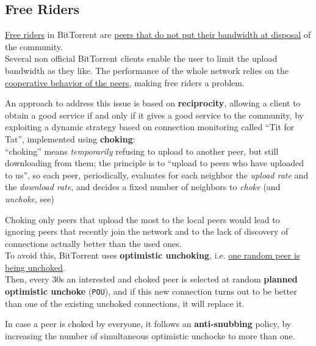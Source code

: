 \subsection{Free Riders}
\ul{Free riders} in BitTorrent are \ul{peers that do not put their bandwidth at disposal} of the community.\\
Several non official BitTorrent clients enable the user to limit the upload bandwidth as they like.
The performance of the whole network relies on the \ul{cooperative behavior of the peers}, making free riders a problem.

An approach to address this issue is based on \textbf{reciprocity}, allowing a client to obtain a good service if and only if it gives a good service to the community, by exploiting a dynamic strategy based on connection monitoring called ``Tit for Tat'', implemented using \textbf{choking}:\\
``choking'' means \textit{temporarily} refusing to upload to another peer, but still downloading from them;  
the principle is to ``upload to peers who have uploaded to us'', so each peer, periodically, evaluates for each neighbor  the \textit{upload rate} and the \textit{download rate}, and decides a fixed number of neighbors to \textit{choke} (and \textit{unchoke}, see)


Choking only peers that upload the most to the local peers would lead to ignoring peers that recently join the network
and to the lack of discovery of connections actually better than the used ones.\\
To avoid this, BitTorrent uses \textbf{optimistic unchoking}, i.e. \ul{one random peer is being unchoked}.\\
Then, every 30s an interested and choked peer is selected at random \textbf{planned optimistic unchoke} (\texttt{POU}), and if this new connection turns out to be better than one of the existing
unchoked connections, it will replace it.

In case a peer is choked by everyone, it follows an \textbf{anti-snubbing} policy, by increasing the number of simultaneous optimistic unchocke to more than one.

